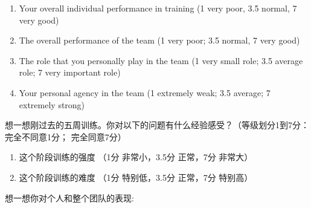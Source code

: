 \begin{CJK}{UTF8}{gbsn}
\begin{enumerate}
\item Your overall individual performance in training (1 very poor, 3.5 normal, 7 very good)
\item The overall performance of the team (1 very poor; 3.5 normal, 7 very good)
\item The role that you personally play in the team (1 very small role; 3.5 average role; 7 very important role)
\item  Your personal agency in the team (1 extremely weak;  3.5 average; 7 extremely strong)
\end{enumerate}


想一想刚过去的五周训练。你对以下的问题有什么经验感受？（等级划分1到7分：完全不同意1分； 完全同意7分）
\begin{enumerate}
\item 这个阶段训练的强度 （1分 非常小，3.5分 正常，7分 非常大）
\item 这个阶段训练的难度 （1分 特别低，3.5分 正常，7分 特别高）
\end{enumerate}

想一想你对个人和整个团队的表现:


\end{CJK}
